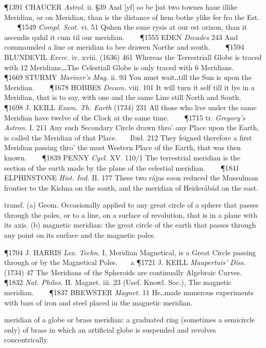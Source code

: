 \begin{description}[wide, labelwidth=!, labelindent=0pt]
\begin{myenumerate}
\P 1391 CHAUCER  \textit{Astrol.} ii. §39 And [yf] so be þat two townes haue illike Meridian, or on Meridian, than is the distance of hem bothe ylike fer fro the Est.    
\P 1549  \textit{Compl. Scot.} vi. 51 Quhen the sune rysis at our est orizon, than it ascendis quhil it cum til our meridian.    
\P 1555 EDEN  \textit{Decades} 243 And commaunded a line or meridian to bee drawen Northe and south.    
\P 1594 BLUNDEVIL  \textit{Exerc.} iv. xviii. (1636) 461 Whereas the Terrestriall Globe is traced with 12 Meridians,‥The Celestiall Globe is only traced with 6 Meridians.    
\P 1669 STURMY  \textit{Mariner's Mag.} ii. 93 You must wait‥till the Sun is upon the Meridian.    
\P 1678 HOBBES  \textit{Decam.} viii. 101 It will turn it self till it lye in a Meridian, that is to say, with one and the same Line still North and South.    
\P 1698 J. KEILL  \textit{Exam. Th. Earth} (1734) 231 All those who live under the same Meridian have twelve of the Clock at the same time.    
\P 1715 tr.  \textit{Gregory's Astron.} I. 211 Any such Secondary Circle drawn thro' any Place upon the Earth, is called the Meridian of that Place.    Ibid. 212 They feigned therefore a first Meridian passing thro' the most Western Place of the Earth, that was then known.    
\P 1839 PENNY  \textit{Cycl.} XV. 110/1 The terrestrial meridian is the section of the earth made by the plane of the celestial meridian.    
\P 1841 ELPHINSTONE  \textit{Hist. Ind.} II. 177 These two rájas soon reduced the Mussulman frontier to the Kishna on the south, and the meridian of Heiderábád on the east.

 transf. (a) Geom. Occasionally applied to any great circle of a sphere that passes through the poles, or to a line, on a surface of revolution, that is in a plane with its axis. (b) magnetic meridian: the great circle of the earth that passes through any point on its surface and the magnetic poles.

\P 1704 J. HARRIS  \textit{Lex. Techn.} I, Meridian Magnetical, is a Great Circle passing through or by the Magnetical Poles.    a 
\P 1721 J. KEILL  \textit{Maupertuis' Diss.} (1734) 47 The Meridians of the Spheroids are continually Algebraic Curves.    
\P 1832 \textit{Nat.  Philos.} II. Magnet. iii. 23 (Usef. Knowl. Soc.), The magnetic meridian.    
\P 1837 BREWSTER  \textit{Magnet.} 11 He‥made numerous experiments with bars of iron and steel placed in the magnetic meridian.

 meridian of a globe or brass meridian: a graduated ring (sometimes a semicircle only) of brass in which an artificial globe is suspended and revolves concentrically.


\end{myenumerate}
\end{description}
